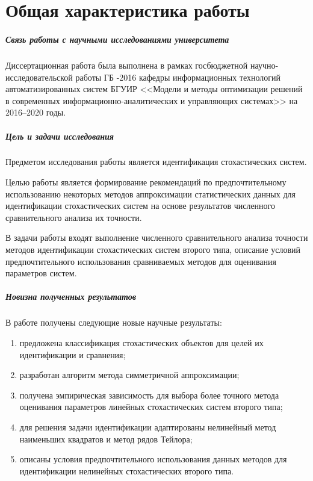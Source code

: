 \chapter*{Общая характеристика работы}

\paragraph{Связь работы с научными исследованиями университета}
Диссертационная работа была выполнена в рамках госбюджетной
научно-исследовательской работы ГБ -2016 кафедры
информационных технологий автоматизированных систем БГУИР
<<Модели и методы оптимизации решений в современных
информационно-аналитических и управляющих системах>>
на 2016--2020 годы.

\paragraph{Цель и задачи исследования}
Предметом исследования работы является идентификация стохастических систем.

Целью работы является формирование рекомендаций по предпочтительному использованию
некоторых методов аппроксимации статистических данных для идентификации
стохастических систем на основе результатов численного сравнительного
анализа их точности.

В задачи работы входят выполнение численного сравнительного анализа
точности методов идентификации стохастических систем второго типа,
описание условий предпочтительного использования сравниваемых методов
для оценивания параметров систем.

\paragraph{Новизна полученных результатов}

В работе получены следующие новые научные результаты:
\begin{enumerate}
\item предложена классификация стохастических объектов для целей их
  идентификации и сравнения;
\item разработан алгоритм метода симметричной аппроксимации;
\item получена эмпирическая зависимость для выбора более точного метода
  оценивания параметров линейных стохастических систем второго типа;
\item для решения задачи идентификации адаптированы нелинейный метод
  наименьших квадратов и метод рядов Тейлора;
\item описаны условия предпочтительного использования данных
  методов для идентификации нелинейных стохастических второго типа.
\end{enumerate}

